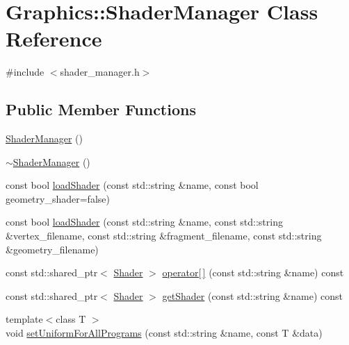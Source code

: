 \hypertarget{class_graphics_1_1_shader_manager}{}\section{Graphics\+:\+:Shader\+Manager Class Reference}
\label{class_graphics_1_1_shader_manager}


{\ttfamily \#include $<$shader\+\_\+manager.\+h$>$}

\subsection*{Public Member Functions}
\begin{DoxyCompactItemize}
\item 
\hyperlink{class_graphics_1_1_shader_manager_ac5f14e07d3b7bffa4b4cf63d9c4fb3a7}{Shader\+Manager} ()
\item 
\hyperlink{class_graphics_1_1_shader_manager_a1846632f26cfcb4907844716f23e0540}{$\sim$\+Shader\+Manager} ()
\item 
const bool \hyperlink{class_graphics_1_1_shader_manager_a29234192f964ad1d9da812e8ceab008f}{load\+Shader} (const std\+::string \&name, const bool geometry\+\_\+shader=false)
\item 
const bool \hyperlink{class_graphics_1_1_shader_manager_a0cd014938152e36fd81717dadd7e390a}{load\+Shader} (const std\+::string \&name, const std\+::string \&vertex\+\_\+filename, const std\+::string \&fragment\+\_\+filename, const std\+::string \&geometry\+\_\+filename)
\item 
const std\+::shared\+\_\+ptr$<$ \hyperlink{class_graphics_1_1_shader}{Shader} $>$ \hyperlink{class_graphics_1_1_shader_manager_a4a3c0f369be06a34a8e44ad8a41862a4}{operator\mbox{[}$\,$\mbox{]}} (const std\+::string \&name) const 
\item 
const std\+::shared\+\_\+ptr$<$ \hyperlink{class_graphics_1_1_shader}{Shader} $>$ \hyperlink{class_graphics_1_1_shader_manager_a8c82c5f8d73dbb9ec3038b2db71add41}{get\+Shader} (const std\+::string \&name) const 
\item 
{\footnotesize template$<$class T $>$ }\\void \hyperlink{class_graphics_1_1_shader_manager_a506437c5209786ccd03c3243de456cd3}{set\+Uniform\+For\+All\+Programs} (const std\+::string \&name, const T \&data)
\end{DoxyCompactItemize}
